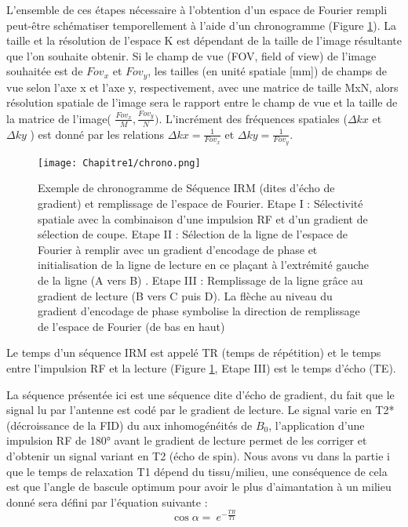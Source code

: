 L’ensemble de ces étapes nécessaire à l’obtention d’un espace de Fourier rempli peut-être schématiser temporellement à l’aide d’un chronogramme (Figure \ref{fig:chrono}). La taille et la résolution de l’espace K est dépendant de la taille de l’image résultante que l’on souhaite obtenir.  Si le champ de vue (FOV, field of view) de l’image souhaitée est de $Fov_x$ et $Fov_y$,  les tailles (en unité spatiale [mm])  de champs de vue selon l’axe x et l’axe y, respectivement, avec une matrice de taille MxN, alors résolution spatiale de l’image sera le rapport entre le champ de vue et la taille de la matrice de l’image( $\frac{{Fov}_x}{M},\frac{{Fov}_y}{N} )$. L’incrément des fréquences spatiales ($\Delta kx$ et $\Delta ky$ ) est donné par les relations $\Delta kx= \frac{1}{{Fov}_x}$ et $\Delta ky= \frac{1}{{Fov}_y}$.

\begin{figure}[!htbp]
  \begin{center}
    \texttt{[image: Chapitre1/chrono.png]}
     \end{center}
    \caption{Exemple de chronogramme de Séquence IRM (dites d'écho de gradient) et remplissage de l'espace de Fourier. Etape I : Sélectivité spatiale avec la combinaison d’une impulsion RF et d’un gradient de sélection de coupe. Etape II : Sélection de la ligne de l’espace de Fourier à remplir avec un gradient d’encodage de phase et initialisation de la ligne de lecture en ce plaçant à l’extrémité gauche de la ligne (A vers B) . Etape III : Remplissage de la ligne grâce au gradient de lecture (B vers C puis D). La flèche au niveau du gradient d’encodage de phase symbolise la direction de remplissage de l’espace de Fourier (de bas en haut)}
  \label{fig:chrono}
\end{figure}

Le temps d’un séquence IRM est appelé TR (temps de répétition) et le temps entre l’impulsion RF et la lecture (Figure \ref{fig:chrono}, Etape III) est le temps d’écho (TE).

La séquence présentée ici est une séquence dite d’écho de gradient, du fait que le signal lu par l’antenne est codé par le gradient de lecture. Le signal varie en T2* (décroissance de la FID) du aux inhomogénéités de $B_0$, l’application d’une impulsion RF de 180° avant le gradient de lecture permet de les corriger et d’obtenir un signal variant en T2 (écho de spin).
Nous avons vu dans la partie i que le temps de relaxation T1 dépend du tissu/milieu, une conséquence de cela est que l’angle de bascule optimum pour avoir le plus d’aimantation à un milieu donné sera défini par l’équation suivante \cite{Ernst1966} :
\begin{equation}
\nonumber
\cos{\alpha}=\ e^{-\frac{TR}{T1}}
\end{equation}

